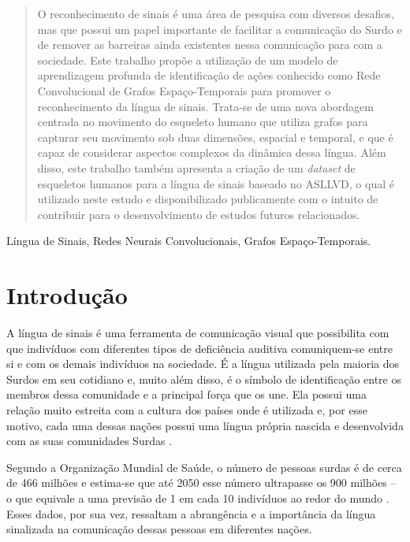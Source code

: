

\maketitle
\begin{abstract}
O reconhecimento de sinais é uma área de pesquisa com diversos desafios, mas que possui um papel importante de facilitar a comunicação do Surdo e de remover as barreiras ainda existentes nessa comunicação para com a sociedade. Este trabalho propõe a utilização de um modelo de aprendizagem profunda de identificação de ações conhecido como Rede Convolucional de Grafos Espaço-Temporais para promover o reconhecimento da língua de sinais. Trata-se de uma nova abordagem centrada no movimento do esqueleto humano que utiliza grafos para capturar seu movimento sob duas dimensões, espacial e temporal, e que é capaz de considerar aspectos complexos da dinâmica dessa língua. Além disso, este trabalho também apresenta a criação de um \textit{dataset} de esqueletos humanos para a língua de sinais baseado no ASLLVD, o qual é utilizado neste estudo e disponibilizado publicamente com o intuito de contribuir para o desenvolvimento de estudos futuros relacionados.
\end{abstract}

\begin{IEEEkeywords}
Língua de Sinais, Redes Neurais Convolucionais, Grafos Espaço-Temporais.
\end{IEEEkeywords}


\section{Introdução} %
\label{sec:introducao}

A língua de sinais é uma ferramenta de comunicação visual que possibilita com que indivíduos com diferentes tipos de deficiência auditiva comuniquem-se entre si e com os demais indivíduos na sociedade. É a língua utilizada pela maioria dos Surdos em seu cotidiano e, muito além disso, é o símbolo de identificação entre os membros dessa comunidade e a principal força que os une. 
Ela possui uma relação muito estreita com a cultura dos países onde é utilizada e, por esse motivo, cada uma dessas nações possui uma língua própria nascida e desenvolvida com as suas comunidades Surdas \cite{pereira-choi-2011}.

Segundo a Organização Mundial de Saúde, o número de pessoas surdas é de cerca de 466 milhões e estima-se que até 2050 esse número ultrapasse os 900 milhões -- o que equivale a uma previsão de 1 em cada 10 indivíduos ao redor do mundo \cite{who-2018}. Esses dados, por sua vez, ressaltam a abrangência e a importância da língua sinalizada na comunicação dessas pessoas em diferentes nações. 

